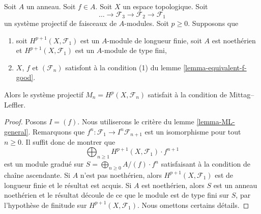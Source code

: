 \begin{lemma}

\label{lemma-ML}

Soit $A$ un anneau. Soit $f \in A$. Soit $X$ un espace topologique. Soit
$$
\ldots \to \mathcal{F}_3 \to \mathcal{F}_2 \to \mathcal{F}_1
$$
un système projectif de faisceaux de $A$-modules. Soit $p \geq 0$. Supposons que

\begin{enumerate}

\item soit $H^{p + 1}(X, \mathcal{F}_1)$ est un $A$-module de longueur finie, soit $A$ est noethérien et $H^{p + 1}(X, \mathcal{F}_1)$ est un $A$-module de type fini,
\item $X$, $f$ et $(\mathcal{F}_n)$ satisfont à la condition (1) du lemme \ref{lemma-equivalent-f-good}.

\end{enumerate}

Alors le système projectif $M_n = H^p(X, \mathcal{F}_n)$ satisfait à la condition de Mittag--Leffler.

\end{lemma}

\begin{proof}

Posons $I = (f)$. Nous utiliserons le critère du lemme \ref{lemma-ML-general}. Remarquons que
$f^n : \mathcal{F}_1 \to I^n\mathcal{F}_{n + 1}$
est un isomorphisme pour tout $n \geq 0$. Il suffit donc de montrer que
$$
\bigoplus\nolimits_{n \geq 1} H^{p + 1}(X, \mathcal{F}_1) \cdot f^{n + 1}
$$
est un module gradué sur $S = \bigoplus_{n \geq 0} A/(f) \cdot f^n$ satisfaisant à la condition de chaîne ascendante. Si $A$ n'est pas noethérien, alors
$H^{p + 1}(X, \mathcal{F}_1)$ est de longueur finie et le résultat est acquis. Si $A$ est noethérien, alors $S$ est un anneau noethérien et le résultat découle de ce que le module est de type fini sur $S$, par l'hypothèse de finitude sur $H^{p + 1}(X, \mathcal{F}_1)$. Nous omettons certains détails.

\end{proof}

